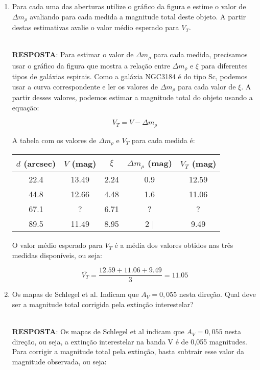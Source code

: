 \documentclass[a4paper,12pt]{article}
\begin{document}
\begin{enumerate}
\begin{enumerate}
\noindent\hrulefill

\item Para cada uma das aberturas utilize o gráfico da figura e estime o valor de $\Delta m_\rho$ avaliando para cada medida a magnitude total deste objeto. A partir destas estimativas avalie o valor médio esperado para $V_T$. 

\noindent\hrulefill\\\textbf{RESPOSTA}: Para estimar o valor de $\Delta m_\rho$ para cada medida, precisamos usar o gráfico da figura que mostra a relação entre $\Delta m_\rho$ e $\xi$ para diferentes tipos de galáxias espirais. Como a galáxia NGC3184 é do tipo Sc, podemos usar a curva correspondente e ler os valores de $\Delta m_\rho$ para cada valor de $\xi$. A partir desses valores, podemos estimar a magnitude total do objeto usando a equação:

$$V_T = V - \Delta m_\rho$$

A tabela com os valores de $\Delta m_\rho$ e $V_T$ para cada medida é:

\begin{center}
\begin{tabular}{|c|c|c|c|c|}
\hline
$d$ (arcsec) & $V$ (mag) & $\xi$ & $\Delta m_\rho$ (mag) & $V_T$ (mag) \\
\hline
22.4         & 13.49     & 2.24  & 0.9                   & 12.59       \\
\hline
44.8         & 12.66     & 4.48  & 1.6                   & 11.06       \\
\hline
67.1         & ?         & 6.71  & ?                     & ?           \\
\hline
89.5         & 11.49     & 8.95  & 2                    |&9.49        \\
\hline
\end{tabular}
\end{center}

O valor médio esperado para $V_T$ é a média dos valores obtidos nas três medidas disponíveis, ou seja:

$$\overline{V_T} = \frac{12.59 + 11.06 + 9.49}{3} = 11.05$$

\noindent\hrulefill

\item Os mapas de Schlegel et al. Indicam que $A_V=0,055$ nesta direção. Qual deve ser a magnitude total corrigida pela extinção interestelar?

\noindent\hrulefill\\\textbf{RESPOSTA}: Os mapas de Schlegel et al indicam que $A_V = 0,055$ nesta direção, ou seja, a extinção interestelar na banda V é de 0,055 magnitudes. Para corrigir a magnitude total pela extinção, basta subtrair esse valor da magnitude observada, ou seja:


\end{enumerate}
\end{enumerate}
\end{document}
